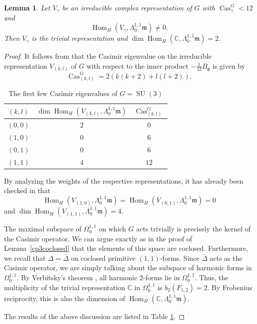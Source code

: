 \documentclass[12pt]{scrartcl}
\theoremstyle{plain}
\newtheorem{lem}[satz]{Lemma}
\theoremstyle{definition}
\newcommand{\C}{\mathbb{C}}%
\newcommand{\Hom}{\operatorname{Hom}}%
\newcommand{\Cas}{\operatorname{Cas}}%
\newcommand{\SU}{\operatorname{SU}}%
\newcommand{\m}{\mathfrak{m}}%
\newcommand{\g}{\mathfrak{g}}%
\begin{document}
\begin{lem}\label{subcrit3}
 Let $V_{\gamma}$ be an irreducible complex representation of $G$ with $\Cas^G_\gamma<12$ and
 \[\Hom_H(V_\gamma,\Lambda^{1,1}_0\m)\neq0.\]
 Then $V_\gamma$ is the trivial representation and $\dim\Hom_H(\C,\Lambda^{1,1}_0\m)=2$.
\end{lem}
\begin{proof}
It follows from \cite[(35)]{hermitianlaplace} that the Casimir eigenvalue on the irreducible representation $V_{(k,l)}$ of $G$ with respect to the inner product $-\frac{1}{12}B_\g$ is given by
\[\Cas_{(k,l)}^G=2(k(k+2)+l(l+2)).\]

\begin{table}[h]
\centering
\begin{tabular}{c|c|c}
$(k,l)$&$\dim\Hom_H(V_{(k,l)},\Lambda^{1,1}_0\m)$&$\Cas_{(k,l)}^G$\\\hline
$(0,0)$&$2$&$0$\\
$(1,0)$&$0$&$6$\\
$(0,1)$&$0$&$6$\\
$(1,1)$&$4$&$12$\\
\end{tabular}
\caption{The first few Casimir eigenvalues of $G=\SU(3)$}
\label{CasSU3}
\end{table}

By analyzing the weights of the respective representations, it has already been checked in \cite[Sec.~5.6]{hermitianlaplace} that 
\[\Hom_H(V_{(1,0)},\Lambda^{1,1}_0\m)=\Hom_H(V_{(0,1)},\Lambda^{1,1}_0\m)=0\]
and $\dim\Hom_H(V_{(1,1)},\Lambda^{1,1}_0\m)=4$.

The maximal subspace of $\Omega^{1,1}_0$ on which $G$ acts trivially is precisely the kernel of the Casimir operator. We can argue exactly as in the proof of Lemma~\ref{cp3coclosed} that the elements of this space are coclosed. Furthermore, we recall that $\Delta=\bar\Delta$ on coclosed primitive $(1,1)$-forms. Since $\bar\Delta$ acts as the Casimir operator, we are simply talking about the subspace of harmonic forms in $\Omega^{1,1}_0$. By Verbitsky's theorem \cite[Thm.~6.2]{verbitsky}, all harmonic $2$-forms lie in $\Omega^{1,1}_0$. Thus, the multiplicity of the trivial representation $\C$ in $\Omega^{1,1}_0$ is $b_2(F_{1,2})=2$. By Frobenius reciprocity, this is also the dimension of $\Hom_H(\C,\Lambda^{1,1}_0\m)$.

The results of the above discussion are listed in Table \ref{CasSU3}.
\end{proof}
\end{document}

